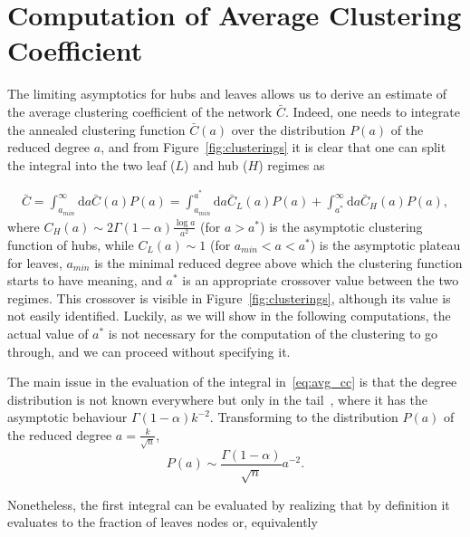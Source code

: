 \documentclass[ twocolumn,
 amsmath,amssymb,
 aps, pre, amsthm, amsfonts,
]{revtex4-2}
\begin{document}
\section{Computation of Average Clustering Coefficient}


The limiting asymptotics for hubs and leaves allows us to derive an estimate of the average clustering coefficient of the network $\bar{C}$. Indeed, one needs to integrate the annealed clustering function $\bar{C}(a)$ over the distribution $P(a)$ of the reduced degree $a$, and from Figure~\ref{fig:clusterings} it is clear that one can split the integral into the two leaf ($L$) and hub ($H$) regimes as

\begin{align}
    \bar{C} =  \int_{a_{min}}^{\infty} {\mathrm d}a \bar{C}(a) P(a)
    = \int_{a_{min}}^{a^*} {\mathrm d}a \bar{C}_L(a) P(a) + \int_{a^*}^{\infty} {\mathrm d}a \bar{C}_H(a) P(a),
    \label{eq:avg_cc}
\end{align}
where $C_{H}(a) \sim 2 \Gamma(1-\alpha) \frac{\log a}{a^2}$ (for $a>a^*$) is the asymptotic clustering function of hubs, while $C_{L}(a)\sim 1$ (for $a_{min}<a<a^*$) is the asymptotic plateau for leaves, $a_{min}$ is the minimal reduced degree above which the clustering function starts to have meaning, and $a^*$ is an appropriate crossover value between the two regimes. This crossover is visible in Figure~\ref{fig:clusterings}, although its value is not easily identified. Luckily, as we will show in the following computations, the actual value of $a^*$ is not necessary for the computation of the clustering to go through, and we can proceed without specifying it.

The main issue in the evaluation of the integral in~\eqref{eq:avg_cc} is that the degree distribution is not known everywhere but only in the tail~\cite{avena2022inhomogeneous},  where it has the asymptotic behaviour $\Gamma(1-\alpha) k^{-2}$. Transforming to the distribution $P(a)$ of the reduced degree $a = \frac{k}{\sqrt{n}}$,
\begin{equation}
    P(a) \sim \frac{\Gamma(1-\alpha)}{\sqrt{n}} a^{-2}.
\end{equation}

Nonetheless, the first integral can be evaluated by realizing that by definition it evaluates to the fraction of leaves nodes or, equivalently
\end{document}
